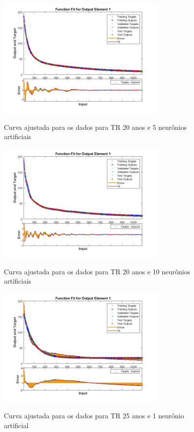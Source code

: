 \begin{figure}[h]
    \caption{Curva ajustada para os dados para TR 20 anos e 5 neurônios artificiais}
    \centering
    \includegraphics[width=0.74\textwidth]{Textuais/Figuras/NN/tr20-5neuronio.png}
    \label{fig:tr20-5n}
\end{figure}

\begin{figure}[h]
    \caption{Curva ajustada para os dados para TR 20 anos e 10 neurônios artificiais}
    \centering
    \includegraphics[width=0.74\textwidth]{Textuais/Figuras/NN/tr20-10neuronio.png}
    \label{fig:tr20-10n}
\end{figure}

\begin{figure}[h]
    \caption{Curva ajustada para os dados para TR 25 anos e 1 neurônio artificial}
    \centering
    \includegraphics[width=0.74\textwidth]{Textuais/Figuras/NN/tr25-1neuronio.png}
    \label{fig:tr25-1n}
\end{figure}

